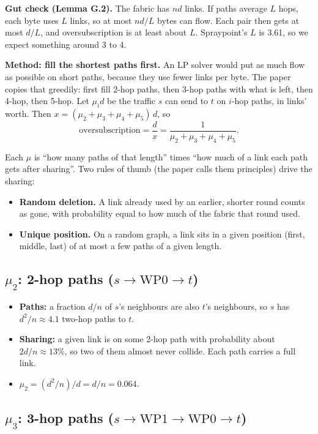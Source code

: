 \documentclass[11pt]{article}
\begin{document}
\textbf{Gut check (Lemma G.2).} The fabric has $n d$ links. If paths average $L$ hops, each byte uses $L$ links, so at most $n d / L$ bytes can flow. Each pair then gets at most $d / L$, and oversubscription is at least about $L$. Spraypoint's $L$ is 3.61, so we expect something around 3 to 4.

\textbf{Method: fill the shortest paths first.} An LP solver would put as much flow as possible on short paths, because they use fewer links per byte. The paper copies that greedily: first fill 2-hop paths, then 3-hop paths with what is left, then 4-hop, then 5-hop. Let $\mu_i d$ be the traffic $s$ can send to $t$ on $i$-hop paths, in links' worth. Then $x = (\mu_2 + \mu_3 + \mu_4 + \mu_5)\, d$, so
\[
\text{oversubscription} = \frac{d}{x} = \frac{1}{\mu_2 + \mu_3 + \mu_4 + \mu_5}.
\]

Each $\mu$ is ``how many paths of that length'' times ``how much of a link each path gets after sharing''. Two rules of thumb (the paper calls them principles) drive the sharing:
\begin{itemize}
  \item \textbf{Random deletion.} A link already used by an earlier, shorter round counts as gone, with probability equal to how much of the fabric that round used.
  \item \textbf{Unique position.} On a random graph, a link sits in a given position (first, middle, last) of at most a few paths of a given length.
\end{itemize}

\subsection*{$\mu_2$: 2-hop paths ($s \to \text{WP0} \to t$)}

\begin{itemize}
  \item \textbf{Paths:} a fraction $d/n$ of $s$'s neighbours are also $t$'s neighbours, so $s$ has $d^2/n \approx 4.1$ two-hop paths to $t$.
  \item \textbf{Sharing:} a given link is on some 2-hop path with probability about $2d/n \approx 13\%$, so two of them almost never collide. Each path carries a full link.
  \item $\mu_2 = (d^2/n) / d = d/n = \mathbf{0.064}$.
\end{itemize}

\subsection*{$\mu_3$: 3-hop paths ($s \to \text{WP1} \to \text{WP0} \to t$)}
\end{document}
